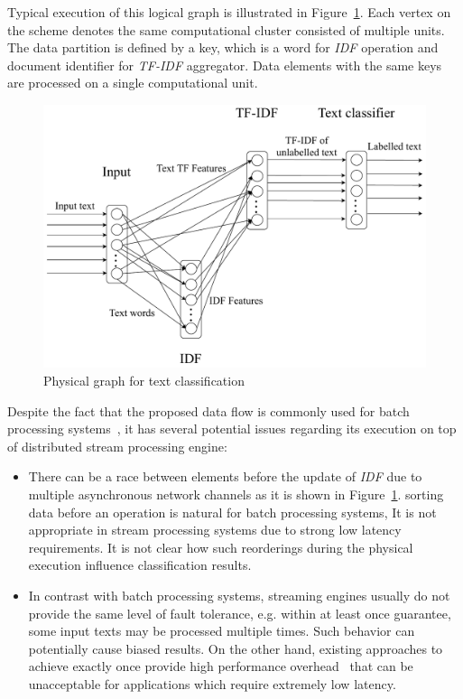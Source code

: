 Typical execution of this logical graph is illustrated in Figure~\ref{physical_graph}. Each vertex on the scheme denotes the same computational cluster consisted of multiple units. The data partition is defined by a key, which is a word for {\em IDF} operation and document identifier for {\em TF-IDF} aggregator. Data elements with the same keys are processed on a single computational unit.

\begin{figure}[htbp]
  \centering
  \includegraphics[scale=0.375]{pics/physical-graph-no-part-fit}
  \caption{Physical graph for text classification}
  \label {physical_graph}
\end{figure}

Despite the fact that the proposed data flow is commonly used for batch processing systems~\cite{semberecki2016distributed}, it has several potential issues regarding its execution on top of distributed stream processing engine:

\begin{itemize}
    \item There can be a race between elements before the update of {\em IDF} due to multiple asynchronous network channels as it is shown in Figure~\ref{physical_graph}. 
     sorting data before an operation is natural for batch processing systems,     It  is not appropriate in stream processing systems      due to strong low latency requirements.
    It is  not    clear how such reorderings during the physical execution influence classification results.
    
    \item 
    In contrast with batch processing systems, streaming engines usually do not provide the same level of fault tolerance, e.g. within at least once guarantee, some input texts may be processed multiple times. Such behavior can potentially cause biased results. On the other hand, existing approaches to achieve exactly once provide high performance overhead~\cite{we2018beyondmr} that can be unacceptable for applications which require extremely low latency.
\end{itemize}